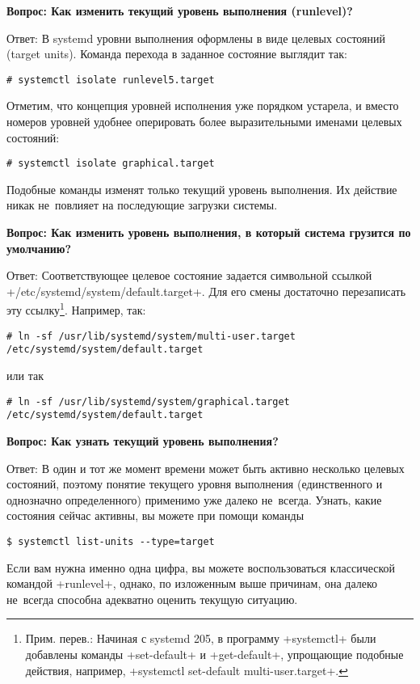 \documentclass[10pt,oneside,a4paper]{article}
\newcommand{\qna}[1]{\medskip\par\textbf{Вопрос: #1}\nopagebreak\par Ответ:}
\begin{document}
\qna{Как изменить текущий уровень выполнения (runlevel)?}
В systemd уровни выполнения оформлены в виде целевых состояний (target units).
Команда перехода в заданное состояние выглядит так:
\begin{Verbatim}
# systemctl isolate runlevel5.target
\end{Verbatim}

Отметим, что концепция уровней исполнения уже порядком устарела, и вместо
номеров уровней удобнее оперировать более выразительными именами целевых
состояний:
\begin{Verbatim}
# systemctl isolate graphical.target
\end{Verbatim}

Подобные команды изменят только текущий уровень выполнения. Их действие никак
не~повлияет на последующие загрузки системы.

\qna{Как изменить уровень выполнения, в который система грузится по умолчанию?}
Соответствующее целевое состояние задается символьной ссылкой
+/etc/systemd/system/default.target+. Для его смены достаточно перезаписать эту
ссылку\footnote{Прим. перев.: Начиная с systemd 205, в программу +systemctl+
были добавлены команды +set-default+ и +get-default+, упрощающие подобные
действия, например, +systemctl set-default multi-user.target+.}. Например, так:
\begin{Verbatim}
# ln -sf /usr/lib/systemd/system/multi-user.target /etc/systemd/system/default.target
\end{Verbatim}
или так
\begin{Verbatim}
# ln -sf /usr/lib/systemd/system/graphical.target /etc/systemd/system/default.target
\end{Verbatim}

\qna{Как узнать текущий уровень выполнения?}
В один и тот же момент времени может быть активно несколько целевых состояний,
поэтому понятие текущего уровня выполнения (единственного и однозначно
определенного) применимо уже далеко не~всегда. Узнать, какие состояния сейчас
активны, вы можете при помощи команды
\begin{Verbatim}
$ systemctl list-units --type=target
\end{Verbatim}

Если вам нужна именно одна цифра, вы можете воспользоваться классической
командой +runlevel+, однако, по изложенным выше причинам, она далеко не~всегда
способна адекватно оценить текущую ситуацию.
\end{document}
